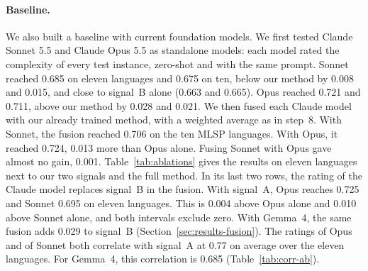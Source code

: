 \paragraph{Baseline.} We also built a baseline with current foundation models. We first tested Claude Sonnet 5.5 and %
Claude Opus 5.5 as standalone models: each model rated the complexity of every test instance,
zero-shot and with the same prompt. Sonnet reached 0.685 on eleven languages and 0.675 on ten, below
our method by 0.008 and 0.015, and close to signal~B alone (0.663 and 0.665). Opus reached 0.721 %
and 0.711, above our method by 0.028 and 0.021. We then fused each Claude model with our already %
trained method, with a weighted average as in step~8. With Sonnet, the fusion reached 0.706 on the %
ten MLSP languages. With Opus, it reached 0.724, 0.013 more than Opus alone. Fusing Sonnet with %
Opus gave almost no gain, 0.001. %
Table~\ref{tab:ablations} gives the results on eleven languages next to our two signals and the
full method. In its last two rows, the rating of the Claude model replaces signal~B in the fusion.
With signal~A, Opus reaches 0.725 and Sonnet 0.695 on eleven languages. This is 0.004 above Opus %
alone and 0.010 above Sonnet alone, and both intervals exclude zero. With Gemma~4, the same %
fusion adds 0.029 to signal~B (Section~\ref{sec:results-fusion}). The ratings of Opus and of %
Sonnet both correlate with signal~A at 0.77 on average over the eleven languages. For Gemma~4, %
this correlation is 0.685 (Table~\ref{tab:corr-ab}). %

